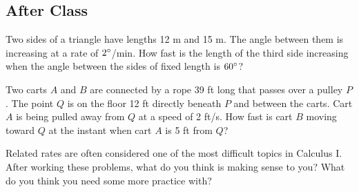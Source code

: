 \documentclass[notes]{subfiles}
\begin{document}
	\subsection*{After Class}	
		\begin{ex}
			Two sides of a triangle have lengths 12 m and 15 m.  The angle between them is increasing at a rate of $2^\circ$/min.  How fast is the length of the third side increasing when the angle between the sides of fixed length is $60^\circ$?
		\end{ex}
			
		\begin{ex}
			Two carts $A$ and $B$ are connected by a rope 39 ft long that passes over a pulley $P$.  The point $Q$ is on the floor 12 ft directly beneath $P$ and between the carts.  Cart $A$ is being pulled away from $Q$ at a speed of 2 ft/s.  How fast is cart $B$ moving toward $Q$ at the instant when cart $A$ is 5 ft from $Q$?
		\end{ex}		
			\newpage
			
		\begin{question}
			Related rates are often considered one of the most difficult topics in Calculus I.  After working these problems, what do you think is making sense to you?  What do you think you need some more practice with?
		\end{question}
			
	\clearpage
\end{document}

